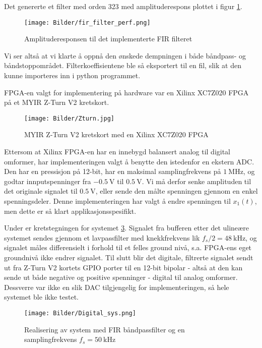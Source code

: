 Det genererte et filter med orden 323 med amplituderespons plottet i figur \ref{fig:fir_filter_perf}.
\begin{figure}[H]
    \centering 
    \texttt{[image: Bilder/fir\_filter\_perf.png]}
    \caption{Amplituderesponsen til det implementerte FIR filteret}
    \label{fig:fir_filter_perf}
\end{figure}

Vi ser altså at vi klarte å oppnå den ønskede dempningen i både båndpass- og båndstoppområdet. Filterkoeffisientene 
ble så eksportert til en fil, slik at den kunne importeres inn i python programmet.

FPGA-en valgt for implementering på hardware var en Xilinx XC7Z020 FPGA på et MYIR Z-Turn V2 kretskort.
\begin{figure}[H]
    \centering 
    \texttt{[image: Bilder/Zturn.jpg]}
    \caption{MYIR Z-Turn V2 kretskort med en Xilinx XC7Z020 FPGA}
    \label{fig:zturn}
\end{figure}

Ettersom at Xilinx FPGA-en har en innebygd balansert analog til digital omformer, har implementeringen 
valgt å benytte den istedenfor en ekstern ADC. Den har en pressisjon på 12-bit, har en maksimal samplingfrekvens på
$\SI{1}{\mega\hertz}$, og godtar innputspenninger fra $-\SI{0.5}{\volt}$ til $\SI{0.5}{\volt}$. Vi må derfor senke 
amplituden til det originale signalet til $\SI{0.5}{\volt}$, eller sende den målte spenningen gjennom en enkel spenningsdeler.
Denne implementeringen har valgt å endre spenningen til $x_1(t)$, men dette er så klart applikasjonsspesifikt.

Under er kretstegningen for systemet \ref{fig:fir_sys}. Signalet fra bufferen etter det ulineære systemet sendes gjennom et lavpassfilter med 
knekkfrekvens lik $f_s / 2 = \SI{48}{\kilo\hertz}$, og signalet måles differensielt i forhold til et felles ground nivå, s.a. FPGA-ens eget 
groundnivå ikke endrer signalet. Til slutt blir det digitale, filtrerte signalet sendt ut fra Z-Turn V2 kortets GPIO porter til en 
12-bit bipolar - altså at den kan sende ut både negative og positive spenninger - digital til analog omformer. Dessverre var ikke en slik 
DAC tilgjengelig for implementeringen, så hele systemet ble ikke testet.
\begin{figure}[H]
    \centering
    \texttt{[image: Bilder/Digital\_sys.png]}
    \caption{Realisering av system med FIR båndpassfilter og en samplingfrekvens $f_s = \SI{50}{\kilo\hertz}$}
    \label{fig:fir_sys}
\end{figure}

